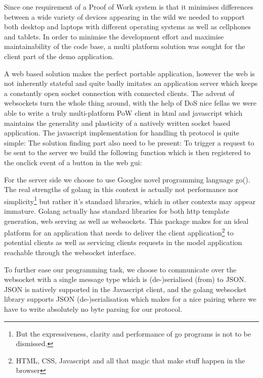 Since one requirement of a Proof of Work system is that it minimises differences between a wide variety of devices appearing in the wild we needed to support both desktop and laptops with different operating systems as well as cellphones and tablets.
In order to minimise the development effort and maximise maintainability of the code base, a multi platform solution was sought for the client part of the demo application. 

A web based solution makes the perfect portable application, however the web is not inherently stateful and quite badly imitates an application server which keeps a constantly open socket connection with connected clients. The advent of websockets turn the whole thing around, with the help of DoS nice fellas we were able to write a truly multi-platform PoW client in html and javascript which maintains the generality and plasticity of a natively written socket based application. The javascript implementation for handling th protocol is quite simple:
The solution finding part also need to be present:
To trigger a request to be sent to the server we build the following function which is then registered to the onclick event of a button in the web gui:

For the server side we choose to use Googles novel programming language go(). The real strengths of golang in this context is actually not performance nor simplicity\footnote{But the expressiveness, clarity and performance of go programs is not to be dismissed.} but rather it's standard libraries, which in other contexts may appear immature. Golang actually has standard libraries for both http template generation, web serving as well as websockets. This package makes for an ideal platform for an application that needs to deliver the client application\footnote{HTML, CSS, Javascript and all that magic that make stuff happen in the browser} to potential clients as well as servicing clients requests in the model application reachable through the websocket interface. 

To further ease our programming task, we choose to communicate over the websocket with a single message type which is (de-)serialised (from) to JSON. JSON is natively supported in the Javascript client, and the golang websocket library supports JSON (de-)serialisation which makes for a nice pairing where we have to write absolutely no byte parsing for our protocol.



